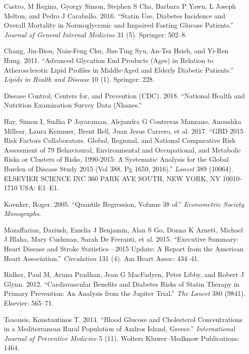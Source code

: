 \documentclass[12pt,]{article}
\begin{document}
\hypertarget{ref-castro2016}{}
Castro, M Regina, Gyorgy Simon, Stephen S Cha, Barbara P Yawn, L Joseph
Melton, and Pedro J Caraballo. 2016. ``Statin Use, Diabetes Incidence
and Overall Mortality in Normoglycemic and Impaired Fasting Glucose
Patients.'' \emph{Journal of General Internal Medicine} 31 (5).
Springer: 502--8.

\hypertarget{ref-chang2011}{}
Chang, Jin-Biou, Nain-Feng Chu, Jhu-Ting Syu, An-Tsz Hsieh, and Yi-Ren
Hung. 2011. ``Advanced Glycation End Products (Ages) in Relation to
Atherosclerotic Lipid Profiles in Middle-Aged and Elderly Diabetic
Patients.'' \emph{Lipids in Health and Disease} 10 (1). Springer: 228.

\hypertarget{ref-NHANES}{}
Disease Control, Centers for, and Prevention (CDC). 2018. ``National
Health and Nutrition Examination Survey Data (Nhanes.''

\hypertarget{ref-hay2017gbd}{}
Hay, Simon I, Sudha P Jayaraman, Alejandra G Contreras Manzano, Anoushka
Millear, Laura Kemmer, Brent Bell, Juan Jesus Carrero, et al. 2017.
``GBD 2015 Risk Factors Collaborators. Global, Regional, and National
Comparative Risk Assessment of 79 Behavioural, Environmental and
Occupational, and Metabolic Risks or Clusters of Risks, 1990-2015: A
Systematic Analysis for the Global Burden of Disease Study 2015 (Vol
388, Pg 1659, 2016).'' \emph{Lancet} 389 (10064). ELSEVIER SCIENCE INC
360 PARK AVE SOUTH, NEW YORK, NY 10010-1710 USA: E1--E1.

\hypertarget{ref-koenker2005}{}
Koenker, Roger. 2005. ``Quantile Regression, Volume 38 of.''
\emph{Econometric Society Monographs}.

\hypertarget{ref-mozaffarian2015executive}{}
Mozaffarian, Dariush, Emelia J Benjamin, Alan S Go, Donna K Arnett,
Michael J Blaha, Mary Cushman, Sarah De Ferranti, et al. 2015.
``Executive Summary: Heart Disease and Stroke Statistics---2015 Update:
A Report from the American Heart Association.'' \emph{Circulation} 131
(4). Am Heart Assoc: 434--41.

\hypertarget{ref-ridker2012}{}
Ridker, Paul M, Aruna Pradhan, Jean G MacFadyen, Peter Libby, and Robert
J Glynn. 2012. ``Cardiovascular Benefits and Diabetes Risks of Statin
Therapy in Primary Prevention: An Analysis from the Jupiter Trial.''
\emph{The Lancet} 380 (9841). Elsevier: 565--71.

\hypertarget{ref-tsaousis2014}{}
Tsaousis, Konstantinos T. 2014. ``Blood Glucose and Cholesterol
Concentrations in a Mediterranean Rural Population of Andros Island,
Greece.'' \emph{International Journal of Preventive Medicine} 5 (11).
Wolters Kluwer--Medknow Publications: 1464.
\end{document}
